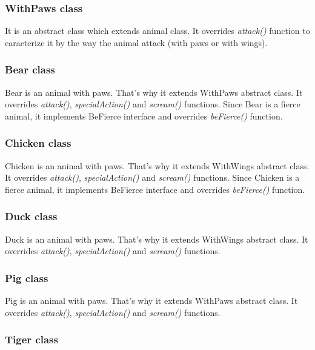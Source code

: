\subsubsection{WithPaws class}

It is an abstract class which extends animal class.
It overrides \textit{attack()} function to caracterize it by the way the animal attack (with paws or with wings).

\subsubsection{Bear class}

Bear is an animal with paws. That's why it extends WithPaws abstract class.
It overrides \textit{attack()}, \textit{specialAction()} and \textit{scream()} functions.
Since Bear is a fierce animal, it implements BeFierce interface and overrides \textit{beFierce()} function.

\subsubsection{Chicken class}

Chicken is an animal with paws. That's why it extends WithWings abstract class.
It overrides \textit{attack()}, \textit{specialAction()} and \textit{scream()} functions.
Since Chicken is a fierce animal, it implements BeFierce interface and overrides \textit{beFierce()} function.

\subsubsection{Duck class}

Duck is an animal with paws. That's why it extends WithWings abstract class.
It overrides \textit{attack()}, \textit{specialAction()} and \textit{scream()} functions.

\subsubsection{Pig class}

Pig is an animal with paws. That's why it extends WithPaws abstract class.
It overrides \textit{attack()}, \textit{specialAction()} and \textit{scream()} functions.

\subsubsection{Tiger class}

